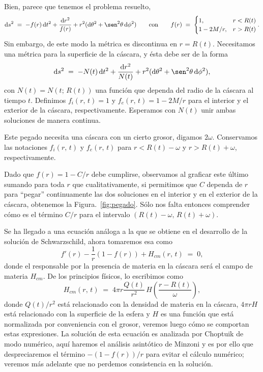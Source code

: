 \documentclass[12pt]{article}
\newcommand{\dx}{\textrm{d}}
\begin{document}
Bien, parece que tenemos el problema resuelto,
$$ \dx s^2 \;=\; -f(r)\,\dx t^2 + \frac{\dx r^2}{f(r)} + r^2(\dx\theta^2 + \sen^2\theta\,\dx\phi^2)
\qquad\text{con}\qquad
f(r) \;=\;
\begin{cases}
    1,             &  r < R(t) \\
    1 - {2M}/{r},  &  r > R(t)
\end{cases}. $$
Sin embargo, de este modo la métrica es discontinua en $r = R(t)$. Necesitamos una métrica para la superficie de la cáscara, y ésta debe ser de la forma
$$ \dx s^2 \;=\; -N(t)\,\dx t^2 + \frac{\dx r^2}{N(t)} + r^2(\dx\theta^2 + \sen^2\theta\,\dx\phi^2), $$
con $N(t) = N(t;\,R(t))$ una función que dependa del radio de la cáscara al tiempo $t$. Definimos $f_i(r,\,t) = 1$ y $f_e(r,\,t) = 1 - 2M/r$ para el interior y el exterior de la cáscara, respectivamente. Esperamos con $N(t)$ unir ambas soluciones de manera continua.

Este pegado necesita una cáscara con un cierto grosor, digamos $2\omega$. Conservamos las notaciones $f_i(r,\,t)$ y $f_e(r,\,t)$ para $r < R(t) - \omega$ y $r > R(t) + \omega$, respectivamente.

Dado que $f(r) = 1 - C/r$ debe cumplirse, observamos al graficar este último sumando para toda $r$ que cualitativamente, si permitimos que $C$ dependa de $r$ para ``pegar'' continuamente las dos soluciones en el interior y en el exterior de la cáscara, obtenemos la Figura.~\ref{fig:pegado}. Sólo nos falta entonces comprender cómo es el término $C/r$ para el intervalo $(R(t) - \omega, \, R(t) + \omega)$.

Se ha llegado a una ecuación análoga a la que se obtiene en el desarrollo de la solución de Schwarzschild, ahora tomaremos esa como
\begin{equation}
\label{eq:omitir}
f'(r) - \frac{1}{r}(1 - f(r)) + H_{cm}(r,\,t) \;=\; 0,
\end{equation}
donde el responsable por la presencia de materia en la cáscara será el campo de materia $H_{cm}$. De los principios físicos, lo escribimos como
$$ H_{cm}(r,\,t) \;=\; 4\pi r\frac{Q(t)}{r^2} \, H\!\left(\frac{r - R(t)}{\omega} \right), $$
donde $Q(t)/r^2$ está relacionado con la densidad de materia en la cáscara, $4\pi rH$ está relacionado con la superficie de la esfera y $H$ es una función que está normalizada por conveniencia con el grosor, veremos luego cómo se comportan estas expresiones. La solución de esta ecuación es analizada por Choptuik \cite{Cho93} de modo numérico, aquí haremos el análisis asintótico de Minzoni y es por ello que despreciaremos el término $-(1 - f(r))/r$ para evitar el cálculo numérico; veremos más adelante que no perdemos consistencia en la solución. 
\end{document}
